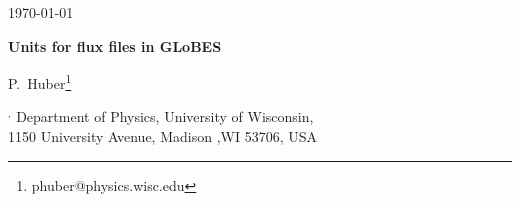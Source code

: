 \documentclass[12pt]{article}
\newcommand{\GLOBES}{{\sf GLoBES}}
\newcommand{\AEDL}{{\sf AEDL}}
\begin{document}


\renewcommand{\thefootnote}{\alph{footnote}}

\vspace*{-3.cm}
\begin{flushright}
\today
\end{flushright}

\vspace*{0.5cm}

\renewcommand{\thefootnote}{\fnsymbol{footnote}}
\setcounter{footnote}{-1}

{\begin{center}
{\Large\bf Units for flux files in GLoBES}
\end{center}}
\renewcommand{\thefootnote}{\alph{footnote}}

\vspace*{.8cm}
{\begin{center} {\large{\sc
                P.~Huber\footnote[1]{
                phuber@physics.wisc.edu}
                }}
\end{center}}
\vspace*{0cm}
{\it
\begin{center}

\footnotemark[1]${}^,$%
      Department of Physics, University of Wisconsin,\\ 
 1150 University
      Avenue, Madison ,WI 53706, USA

\end{center}}

\vspace*{1cm}


\begin{abstract}
A common issue with \GLOBES\ is confusion about the proper units for
the input flux files for use in \AEDL\ experiment descriptions. 
\end{abstract}
\end{document}
